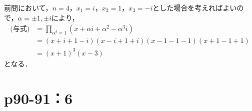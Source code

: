 \documentclass[a4paper,10pt,fleqn]{ltjsarticle}
\begin{document}
\begin{leftbar}
    前問において，$n=4$，$x_1 = i$，$x_2 = 1$，$x_3=-i$とした場合を考えればよいので，$\alpha = \pm 1 , \pm i$により，
    \begin{align*}
        \text{(与式)} & = \prod_{\alpha^4=1} (x+ \alpha i +\alpha^2 -  \alpha^3i ) \\
                    & = (x+i+1-i) (x-i+1+i)(x-1-1-1)(x+1-1+1)                    \\
                    & =(x+1)^3(x-3)
    \end{align*}
    となる．
\end{leftbar}

\newpage

\section*{p90-91：6}
\end{document}
